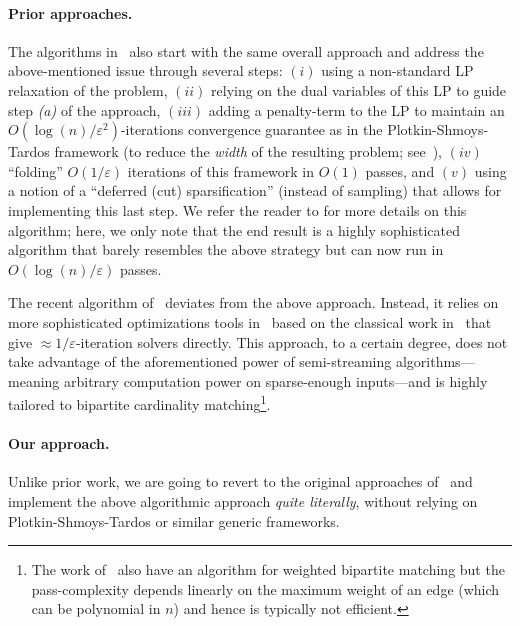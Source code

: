 \documentclass{article}
\newcommand{\eps}{\varepsilon}
\begin{document}
\paragraph{Prior approaches.} The algorithms in~\cite{AhnG11b,AhnG15} also start with the same overall approach and address the above-mentioned issue through several steps: 
$(i)$ using a non-standard LP relaxation of the problem, $(ii)$ relying on the dual variables of this LP to guide step \emph{(a)} of the approach, $(iii)$ adding a penalty-term to the LP to maintain an $O(\log{\!(n)}/\eps^2)$-iterations
convergence guarantee as in the Plotkin-Shmoys-Tardos framework (to reduce the \emph{width} of the resulting problem; see~\cite{PlotkinST91,AroraHK12}), $(iv)$ ``folding'' $O(1/\eps)$ iterations of this framework in $O(1)$ passes, and $(v)$ using a notion of a 
``deferred (cut) sparsification'' (instead of sampling) that allows for implementing this last step. We refer the reader to \cite[Section 1 and 2 of arXiv version 3]{AhnG15} for more details on this algorithm; here, we only note
that the end result is a highly sophisticated algorithm that barely resembles the above strategy but can now run in $O(\log{\!(n)}/\eps)$ passes. 

The  recent algorithm of~\cite{AssadiJJST22} deviates from the above approach. Instead, it relies on more sophisticated optimizations tools in~\cite{Sherman17,JambulapatiST19,CohenST21} 
based on the classical work in~\cite{Nemirovski04,Nesterov07} that give $\approx 1/\eps$-iteration solvers directly. This approach, to a certain degree, does not take advantage of the aforementioned power of semi-streaming algorithms---meaning arbitrary computation power on sparse-enough inputs---and
is highly tailored to bipartite cardinality matching\footnote{The work of~\cite{AssadiJJST22} also have an algorithm for weighted bipartite matching but the pass-complexity depends linearly on the maximum weight of an edge (which can be polynomial in $n$) and hence is typically not  efficient.}.

\paragraph{Our approach.} Unlike prior work, we are going to revert to the original approaches of~\cite{LattanziMSV11,KumarMVV13} and 
implement the above algorithmic approach \emph{quite literally}, without relying on Plotkin-Shmoys-Tardos or similar generic frameworks. 
\end{document}
